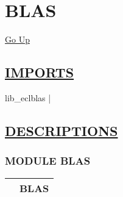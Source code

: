 \chapter*{\color{headfile}
BLAS
}
\hypertarget{ecldoc:toc:BLAS}{}
\hyperlink{ecldoc:toc:root}{Go Up}

\section*{\underline{\textsf{IMPORTS}}}
\begin{doublespace}
{\large
lib\_eclblas |
}
\end{doublespace}

\section*{\underline{\textsf{DESCRIPTIONS}}}
\subsection*{\textsf{\colorbox{headtoc}{\color{white} MODULE}
BLAS}}

\hypertarget{ecldoc:blas}{}

{\renewcommand{\arraystretch}{1.5}
\begin{tabularx}{\textwidth}{|>{\raggedright\arraybackslash}l|X|}
\hline
\hspace{0pt}\mytexttt{\color{red} } & \textbf{BLAS} \\
\hline
\end{tabularx}
}

\par


